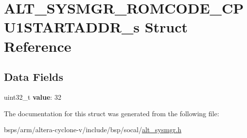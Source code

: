 \hypertarget{structALT__SYSMGR__ROMCODE__CPU1STARTADDR__s}{}\section{A\+L\+T\+\_\+\+S\+Y\+S\+M\+G\+R\+\_\+\+R\+O\+M\+C\+O\+D\+E\+\_\+\+C\+P\+U1\+S\+T\+A\+R\+T\+A\+D\+D\+R\+\_\+s Struct Reference}
\label{structALT__SYSMGR__ROMCODE__CPU1STARTADDR__s}
\subsection*{Data Fields}
\begin{DoxyCompactItemize}
\item 
\mbox{\label{structALT__SYSMGR__ROMCODE__CPU1STARTADDR__s_a5c51d883b120aee1499cd8a30e4b96c5}} 
uint32\+\_\+t {\bfseries value}\+: 32
\end{DoxyCompactItemize}


The documentation for this struct was generated from the following file\+:\begin{DoxyCompactItemize}
\item 
bsps/arm/altera-\/cyclone-\/v/include/bsp/socal/\mbox{\hyperlink{alt__sysmgr_8h}{alt\+\_\+sysmgr.\+h}}\end{DoxyCompactItemize}
